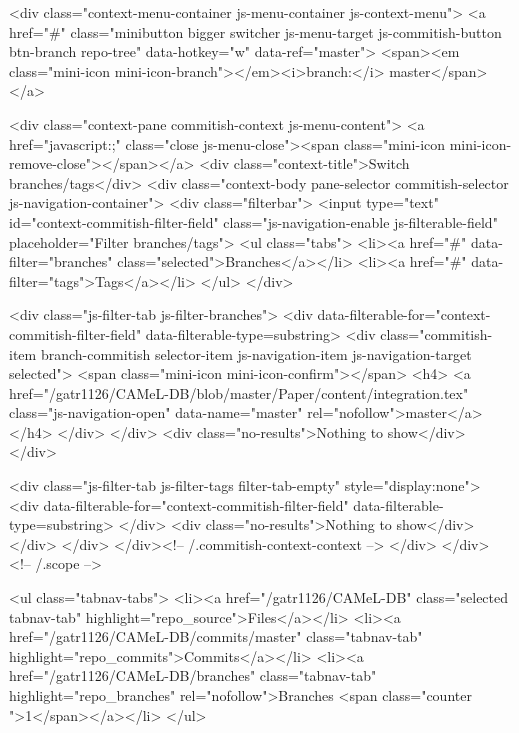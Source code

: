     <div class="context-menu-container js-menu-container js-context-menu">
      <a href="#"
         class="minibutton bigger switcher js-menu-target js-commitish-button btn-branch repo-tree"
         data-hotkey="w"
         data-ref="master">
         <span><em class="mini-icon mini-icon-branch"></em><i>branch:</i> master</span>
      </a>

      <div class="context-pane commitish-context js-menu-content">
        <a href="javascript:;" class="close js-menu-close"><span class="mini-icon mini-icon-remove-close"></span></a>
        <div class="context-title">Switch branches/tags</div>
        <div class="context-body pane-selector commitish-selector js-navigation-container">
          <div class="filterbar">
            <input type="text" id="context-commitish-filter-field" class="js-navigation-enable js-filterable-field" placeholder="Filter branches/tags">
            <ul class="tabs">
              <li><a href="#" data-filter="branches" class="selected">Branches</a></li>
                <li><a href="#" data-filter="tags">Tags</a></li>
            </ul>
          </div>

          <div class="js-filter-tab js-filter-branches">
            <div data-filterable-for="context-commitish-filter-field" data-filterable-type=substring>
                <div class="commitish-item branch-commitish selector-item js-navigation-item js-navigation-target selected">
                  <span class="mini-icon mini-icon-confirm"></span>
                  <h4>
                      <a href="/gatr1126/CAMeL-DB/blob/master/Paper/content/integration.tex" class="js-navigation-open" data-name="master" rel="nofollow">master</a>
                  </h4>
                </div>
            </div>
            <div class="no-results">Nothing to show</div>
          </div>

            <div class="js-filter-tab js-filter-tags filter-tab-empty" style="display:none">
              <div data-filterable-for="context-commitish-filter-field" data-filterable-type=substring>
              </div>
              <div class="no-results">Nothing to show</div>
            </div>
        </div>
      </div><!-- /.commitish-context-context -->
    </div>
  </div> <!-- /.scope -->

  <ul class="tabnav-tabs">
    <li><a href="/gatr1126/CAMeL-DB" class="selected tabnav-tab" highlight="repo_source">Files</a></li>
    <li><a href="/gatr1126/CAMeL-DB/commits/master" class="tabnav-tab" highlight="repo_commits">Commits</a></li>
    <li><a href="/gatr1126/CAMeL-DB/branches" class="tabnav-tab" highlight="repo_branches" rel="nofollow">Branches <span class="counter ">1</span></a></li>
  </ul>

